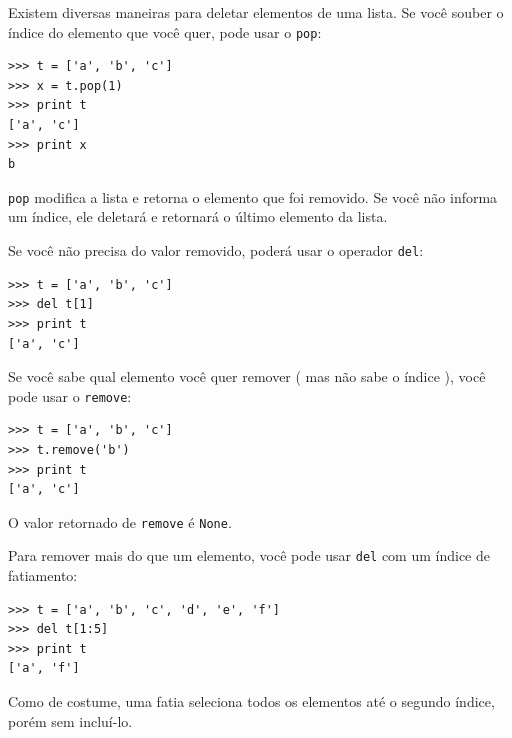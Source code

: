 Existem diversas maneiras para deletar elementos de uma lista. Se você
souber o índice do elemento que você quer, pode usar o {\tt pop}:


\beforeverb
\begin{verbatim}
>>> t = ['a', 'b', 'c']
>>> x = t.pop(1)
>>> print t
['a', 'c']
>>> print x
b
\end{verbatim}
\afterverb
%
{\tt pop} modifica a lista e retorna o elemento que foi removido.
Se você não informa um índice, ele deletará e retornará o último elemento da lista.

Se você não precisa do valor removido, poderá usar o operador {\tt del}:


\beforeverb
\begin{verbatim}
>>> t = ['a', 'b', 'c']
>>> del t[1]
>>> print t
['a', 'c']
\end{verbatim}
\afterverb
%

Se você sabe qual elemento você quer remover ( mas não sabe o índice ), você
pode usar o {\tt remove}:


\beforeverb
\begin{verbatim}
>>> t = ['a', 'b', 'c']
>>> t.remove('b')
>>> print t
['a', 'c']
\end{verbatim}
\afterverb
%
O valor retornado de {\tt remove} é {\tt None}.


Para remover mais do que um elemento, você pode usar {\tt del} com 
um índice de fatiamento:

\beforeverb
\begin{verbatim}
>>> t = ['a', 'b', 'c', 'd', 'e', 'f']
>>> del t[1:5]
>>> print t
['a', 'f']
\end{verbatim}
\afterverb
%
Como de costume, uma fatia seleciona todos os elementos até o segundo índice, porém sem incluí-lo.

